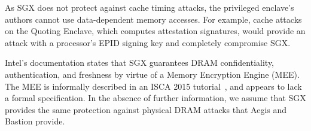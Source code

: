 As SGX does not protect against cache timing attacks, the privileged enclave's
authors cannot use data-dependent memory accesses. For example, cache attacks
on the Quoting Enclave, which computes attestation signatures, would provide
an attack with a processor's EPID signing key and completely compromise SGX.

Intel's documentation states that SGX guarantees DRAM confidentiality,
authentication, and freshness by virtue of a Memory Encryption Engine (MEE).
The MEE is informally described in an ISCA 2015
tutorial~\cite{intel2015iscasgx}, and appears to lack a formal specification.
In the absence of further information, we assume that SGX provides the same
protection against physical DRAM attacks that Aegis and Bastion provide.
